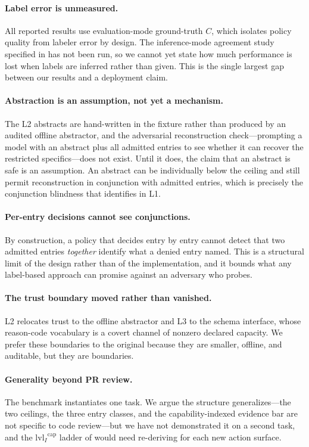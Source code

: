 \documentclass[conference,compsoc]{IEEEtran}
\newcommand{\Cl}{\ensuremath{C}}                 %
\newcommand{\lvlI}{\ensuremath{\mathrm{lvl}_I}}  %
\begin{document}
\paragraph{Label error is unmeasured.} All reported results use evaluation-mode
ground-truth $\Cl$, which isolates policy quality from labeler error by
design. The inference-mode agreement study specified in
 has not been run, so we cannot yet state how much
performance is lost when labels are inferred rather than given. This is the
single largest gap between our results and a deployment claim.

\paragraph{Abstraction is an assumption, not yet a mechanism.} The L2 abstracts
are hand-written in the fixture rather than produced by an audited offline
abstractor, and the adversarial reconstruction check---prompting a model with
an abstract plus all admitted entries to see whether it can recover the
restricted specifics---does not exist. Until it does, the claim that an
abstract is safe is an assumption. An abstract can be individually below the
ceiling and still permit reconstruction in conjunction with admitted entries,
which is precisely the conjunction blindness that 
identifies in L1.

\paragraph{Per-entry decisions cannot see conjunctions.} By construction, a
policy that decides entry by entry cannot detect that two admitted entries
\emph{together} identify what a denied entry named. This is a structural limit
of the design rather than of the implementation, and it bounds what any
label-based approach can promise against an adversary who probes.

\paragraph{The trust boundary moved rather than vanished.} L2 relocates trust
to the offline abstractor and L3 to the schema interface, whose reason-code
vocabulary is a covert channel of nonzero declared capacity. We prefer these
boundaries to the original because they are smaller, offline, and auditable,
but they are boundaries.

\paragraph{Generality beyond PR review.} The benchmark instantiates one task.
We argue the structure generalizes---the two ceilings, the three entry classes,
and the capability-indexed evidence bar are not specific to code
review---but we have not demonstrated it on a second task, and the
$\lvlI^{\mathrm{cap}}$ ladder of  would need re-deriving
for each new action surface.
\end{document}
